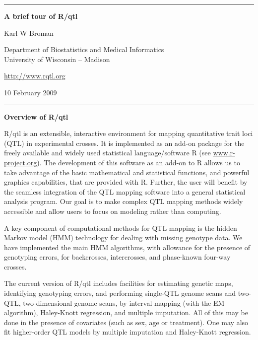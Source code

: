 \documentclass[10pt,letterpaper]{article}
\begin{document}
\begin{center}
\rule{7.0in}{1mm} \vspace{0mm}

{\Large \textbf{A brief tour of R/qtl}} \vspace{4mm}

{\large Karl W Broman} \vspace{2mm}

Department of Biostatistics and Medical Informatics\\
University of Wisconsin -- Madison

\vspace{2mm}
\href{http://www.rqtl.org}{http://www.rqtl.org}
\vspace{2mm}

10 February 2009 %

\rule{7.0in}{1mm} 
\end{center}

\noindent \textbf{Overview of R/qtl} \vspace{6pt}

R/qtl is an extensible, interactive environment for mapping
quantitative trait loci (QTL) in experimental crosses. It is
implemented as an add-on package for the freely available and widely
used statistical language/software R (see
\href{http://www.r-project.org}{www.r-project.org}). The development
of this software as an add-on to R allows us to take advantage of the
basic mathematical and statistical functions, and powerful graphics
capabilities, that are provided with R. Further, the user will benefit
by the seamless integration of the QTL mapping software into a general
statistical analysis program.  Our goal is to make complex QTL mapping
methods widely accessible and allow users to focus on modeling rather
than computing.

A key component of computational methods for QTL mapping is the hidden
Markov model (HMM) technology for dealing with missing genotype
data. We have implemented the main HMM algorithms, with allowance for
the presence of genotyping errors, for backcrosses, intercrosses, and
phase-known four-way crosses.

The current version of R/qtl includes facilities for estimating
genetic maps, identifying genotyping errors, and performing single-QTL
genome scans and two-QTL, two-dimensional genome scans, by interval
mapping (with the EM algorithm), Haley-Knott regression, and multiple
imputation. All of this may be done in the presence of covariates
(such as sex, age or treatment). One may also fit higher-order QTL models
by multiple imputation and Haley-Knott regression.
\end{document}
